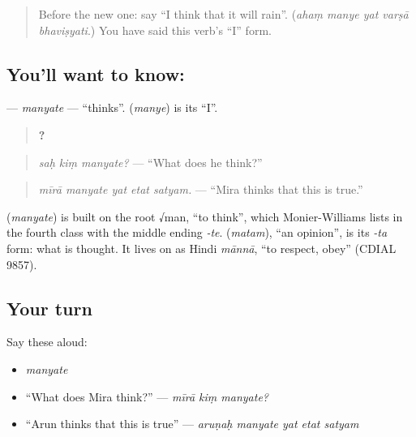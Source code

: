 \begin{quote}
Before the new one: say \textquotedblleft{}I think that it will rain\textquotedblright{}. (\emph{ahaṃ manye yat varṣā bhaviṣyati}.) You have said this verb's \textquotedblleft{}I\textquotedblright{} form.
\end{quote}

\subsection*{You'll want to know: }
\textbf{} — \emph{manyate} — \textquotedblleft{}thinks\textquotedblright{}. \textbf{} (\emph{manye}) is its \textquotedblleft{}I\textquotedblright{}.

\begin{quote}
\textbf{  ?}
\end{quote}

\begin{quote}
\emph{saḥ kiṃ manyate?} — \textquotedblleft{}What does he think?\textquotedblright{}
\end{quote}

\begin{quote}
\textbf{    }
\end{quote}

\begin{quote}
\emph{mīrā manyate yat etat satyam.} — \textquotedblleft{}Mira thinks that this is true.\textquotedblright{}
\end{quote}

\begin{cousinweb}
\textbf{} (\emph{manyate}) is built on the root √man, \textquotedblleft{}to think\textquotedblright{}, which Monier-Williams lists in the fourth class with the middle ending \emph{-te}. \textbf{} (\emph{matam}), \textquotedblleft{}an opinion\textquotedblright{}, is its \emph{-ta} form: what is thought. It lives on as Hindi \emph{mānnā}, \textquotedblleft{}to respect, obey\textquotedblright{} (CDIAL 9857).
\end{cousinweb}

\subsection*{Your turn}
Say these aloud:

\begin{itemize}
\raggedright
  \item \emph{manyate}
  \item \textquotedblleft{}What does Mira think?\textquotedblright{} — \emph{mīrā kiṃ manyate?}
  \item \textquotedblleft{}Arun thinks that this is true\textquotedblright{} — \emph{aruṇaḥ manyate yat etat satyam}
\end{itemize}

